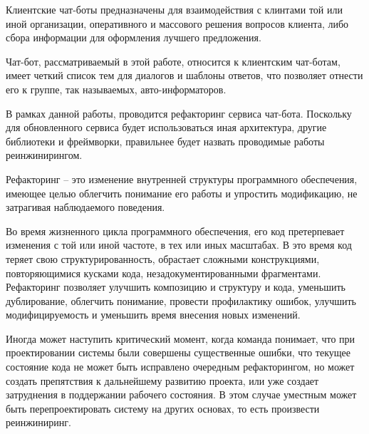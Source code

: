 Клиентские чат-боты предназначены для взаимодействия с клинтами той или иной организации,
оперативного и массового решения вопросов клиента, либо сбора информации
для оформления лучшего предложения.

Чат-бот, рассматриваемый в этой работе, относится к клиентским чат-ботам,
имеет четкий список тем для диалогов и шаблоны ответов, что позволяет отнести
его к группе, так называемых, авто-информаторов.

В рамках данной работы, проводится рефакторинг сервиса чат-бота. Поскольку
для обновленного сервиса будет использоваться иная архитектура, другие библиотеки и
фреймворки, правильнее будет назвать проводимые работы реинжинирингом.

Рефакторинг -- это изменение внутренней структуры программного обеспечения,
имеющее целью облегчить понимание его работы и упростить модификацию,
не затрагивая наблюдаемого поведения. \cite{refactoring.fowler}

Во время жизненного цикла программного обеспечения, его код претерпевает изменения
с той или иной частоте, в тех или иных масштабах. В это время код теряет свою
структурированность, обрастает сложными конструкциями, повторяющимися кусками кода,
незадокументированными фрагментами.
Рефакторинг позволяет улучшить композицию и структуру и кода, уменьшить дублирование,
облегчить понимание, провести профилактику ошибок, улучшить модифицируемость и
уменьшить время внесения новых изменений.

Иногда может наступить критический момент, когда команда понимает,
что при проектировании системы были совершены существенные ошибки,
что текущее состояние кода не может быть исправлено очередным рефакторингом,
но может создать препятствия к дальнейшему развитию проекта,
или уже создает затруднения в поддержании рабочего состояния.
В этом случае уместным может быть перепроектировать систему на других основах,
то есть произвести реинжиниринг.
